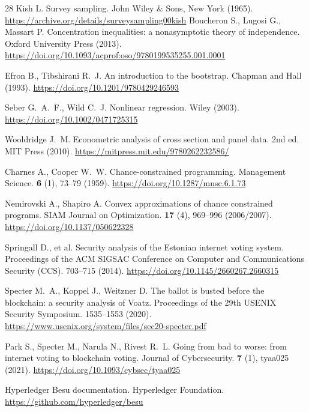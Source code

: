 \begin{thebibliography}{28}
Kish L. Survey sampling. John Wiley \& Sons, New York (1965).
\url{https://archive.org/details/surveysampling00kish}
Boucheron S., Lugosi G., Massart P. Concentration inequalities: a nonasymptotic
theory of independence. Oxford University Press (2013).
\url{https://doi.org/10.1093/acprof:oso/9780199535255.001.0001}

Efron B., Tibshirani R.~J. An introduction to the bootstrap. Chapman and Hall
(1993).
\url{https://doi.org/10.1201/9780429246593}

Seber G.~A.~F., Wild C.~J. Nonlinear regression. Wiley (2003).
\url{https://doi.org/10.1002/0471725315}

Wooldridge J.~M. Econometric analysis of cross section and panel data.
2nd ed. MIT Press (2010).
\url{https://mitpress.mit.edu/9780262232586/}

Charnes A., Cooper W.~W. Chance-constrained programming. Management Science.
\textbf{6} (1), 73--79 (1959).
\url{https://doi.org/10.1287/mnsc.6.1.73}

Nemirovski A., Shapiro A. Convex approximations of chance constrained programs.
SIAM Journal on Optimization. \textbf{17} (4), 969--996 (2006/2007).
\url{https://doi.org/10.1137/050622328}

Springall D., et al. Security analysis of the Estonian internet voting system.
Proceedings of the ACM SIGSAC Conference on Computer and Communications Security
(CCS). 703--715 (2014).
\url{https://doi.org/10.1145/2660267.2660315}

Specter M.~A., Koppel J., Weitzner D. The ballot is busted before the
blockchain: a security analysis of Voatz. Proceedings of the 29th USENIX
Security Symposium. 1535--1553 (2020).
\url{https://www.usenix.org/system/files/sec20-specter.pdf}

Park S., Specter M., Narula N., Rivest R.~L. Going from bad to worse: from
internet voting to blockchain voting. Journal of Cybersecurity. \textbf{7} (1),
tyaa025 (2021).
\url{https://doi.org/10.1093/cybsec/tyaa025}

Hyperledger Besu documentation. Hyperledger Foundation.
\url{https://github.com/hyperledger/besu}


\end{thebibliography}
